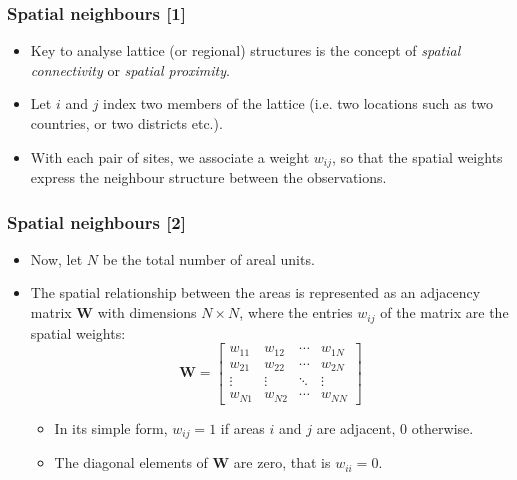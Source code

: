 \documentclass[12pt]{beamer}
\begin{document}
\begin{frame}
\frametitle{Spatial neighbours [1]}
\begin{itemize} \setlength\itemsep{\fill}
\item Key to analyse lattice (or regional) structures is the concept of \emph{spatial connectivity} or \emph{spatial proximity}.
\item Let $i$ and $j$ index two members of the lattice (i.e. two locations such as two countries, or two districts etc.).
\item With each pair of sites, we associate a \alert{weight $w_{ij}$}, so that the spatial weights express the neighbour structure between the observations.
\end{itemize}
\end{frame}

\begin{frame}
\frametitle{Spatial neighbours [2]}
\begin{itemize} \setlength\itemsep{\fill}
\item Now, let $N$ be the total number of areal units.
\item The spatial relationship between the areas is represented as an adjacency matrix $\mathbf{W}$ with dimensions $N \times N$, where the entries $w_{ij}$ of the matrix are the spatial weights:
 \begin{equation*}
\mathbf{W} =
\begin{bmatrix}
w_{11} & w_{12} & \cdots & w_{1N} \\
w_{21} & w_{22} & \cdots & w_{2N} \\
\vdots  & \vdots  & \ddots & \vdots \\
w_{N1} & w_{N2} & \cdots & w_{NN}
\end{bmatrix}
\end{equation*}
\begin{itemize} \setlength\itemsep{\fill}
\item In its simple form, $w_{ij}=1$ if areas $i$ and $j$ are adjacent, 0 otherwise\footnotemark.
\item The diagonal elements of $\mathbf{W}$ are zero, that is $w_{ii}=0$.
\end{itemize}
\end{itemize}
\end{frame}
\end{document}
